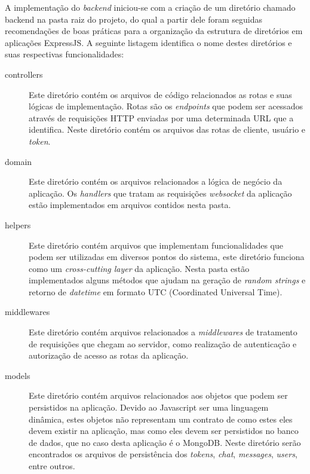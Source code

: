 A implementação do \textit{backend} iniciou-se com a criação de um diretório chamado backend na pasta raiz do projeto, do qual a partir dele foram seguidas recomendações de boas práticas \cite{express-app-structure} para a organização da estrutura de diretórios em aplicações ExpressJS. A seguinte listagem identifica o nome destes diretórios e suas respectivas funcionalidades:

\begin{description}
	\item[controllers] Este diretório contém os arquivos de código relacionados as rotas e suas lógicas de implementação. Rotas são os \textit{endpoints} que podem ser acessados através de requisições HTTP enviadas por uma determinada URL que a identifica. Neste diretório contém os arquivos das rotas de cliente, usuário e \textit{token}.
	
	\item[domain] Este diretório contém os arquivos relacionados a lógica de negócio da aplicação. Os \textit{handlers} que tratam as requisições \textit{websocket} da aplicação estão implementados em arquivos contidos nesta pasta.
	
	\item[helpers] Este diretório contém arquivos que implementam funcionalidades que podem ser utilizadas em diversos pontos do sistema, este diretório funciona como um \textit{cross-cutting layer} da aplicação. Nesta pasta estão implementados alguns métodos que ajudam na geração de \textit{random strings} e retorno de \textit{datetime} em formato UTC (Coordinated Universal Time).
	
	\item[middlewares] Este diretório contém arquivos relacionados a \textit{middlewares} de tratamento de requisições que chegam ao servidor, como realização de autenticação e autorização de acesso as rotas da aplicação.
	
	\item[models] Este diretório contém arquivos relacionados aos objetos que podem ser persistidos na aplicação. Devido ao Javascript ser uma linguagem dinâmica, estes objetos não representam um contrato de como estes eles devem existir na aplicação, mas como eles devem ser persistidos no banco de dados, que no caso desta aplicação é o MongoDB. Neste diretório serão encontrados os arquivos de persistência dos \textit{tokens}, \textit{chat}, \textit{messages}, \textit{users}, entre outros.
\end{description}

